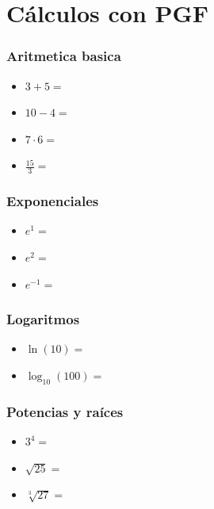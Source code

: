 \documentclass{beamer}
\newcommand{\entero}[1]{\pgfmathprintnumber[fixed, precision=0]{#1}}
\begin{document}
\section{Cálculos con PGF}


\begin{frame}
  \frametitle{Aritmetica basica}
  \begin{itemize}
    \item $3 + 5 =$ \entero{\suma}
    \item $10 - 4=$ \entero{\resta}
    \item $7 \cdot 6 =$ \entero{\multiplicacion}
    \item $\frac{15}{3} =$ \entero{\division}
    \end{itemize}

\end{frame}


\begin{frame}
  \frametitle{Exponenciales}
  \begin{itemize}
    \item $e^1 =$ \textbf{\expoUno}
    \item $e^2 =$ \textbf{\expoDos}
    \item $e^{-1} =$ \textbf{\expNegativo}
  \end{itemize}
\end{frame}


\begin{frame}
  \frametitle{Logaritmos}
  \begin{itemize}
    \item $\ln(10) =$ \textbf{\logNatural}
    \item $\log_{10}(100) =$ \textbf{\logBaseTen}
  \end{itemize}
\end{frame}


\begin{frame}
  \frametitle{Potencias y raíces}
  \begin{itemize}
    \item $3^4 =$ \textbf{\potencia}
    \item $\sqrt{25} =$ \textbf{\raizCuadrada}
    \item $\sqrt[3]{27} =$ \textbf{\raizCubo}
  \end{itemize}
\end{frame}
\end{document}

